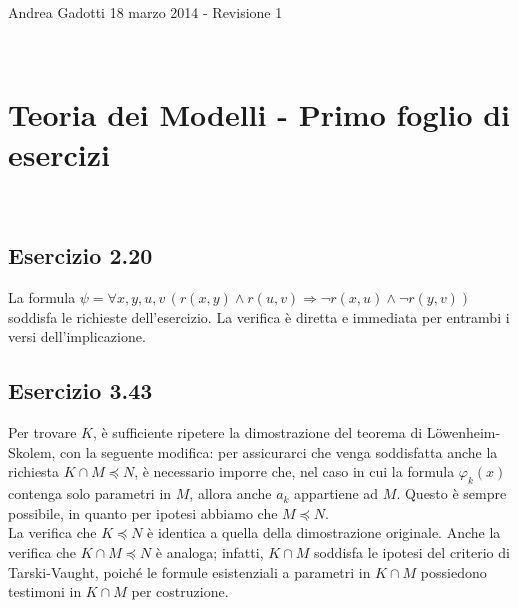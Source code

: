 \documentclass[10pt,a4paper]{article}
\begin{document}
\noindent Andrea Gadotti \hfill 18 marzo 2014 - Revisione 1 

\

\section*{Teoria dei Modelli - Primo foglio di esercizi}

\
\subsection*{Esercizio 2.20}
La formula $\psi= \forall x, y, u, v \, (r(x,y) \wedge r(u,v) \Rightarrow \neg r(x,u) \wedge \neg r(y,v))$ soddisfa le richieste dell'esercizio. La verifica è diretta e immediata per entrambi i versi dell'implicazione.

\subsection*{Esercizio 3.43}
Per trovare $K$, è sufficiente ripetere la dimostrazione del teorema di Löwenheim-Skolem, con la seguente modifica: per assicurarci che venga soddisfatta anche la richiesta $K \cap M \preceq N$, è necessario imporre che, nel caso in cui la formula $\varphi_k(x)$ contenga solo parametri in $M$, allora anche $a_k$ appartiene ad $M$. Questo è sempre possibile, in quanto per ipotesi abbiamo che $M \preceq N$.\\
La verifica che $K \preceq N$ è identica a quella della dimostrazione originale. Anche la verifica che $K \cap M \preceq N$ è analoga; infatti, $K \cap M$ soddisfa le ipotesi del criterio di Tarski-Vaught, poiché le formule esistenziali a parametri in $K \cap M$ possiedono testimoni in $K \cap M$ per costruzione.
\end{document}

